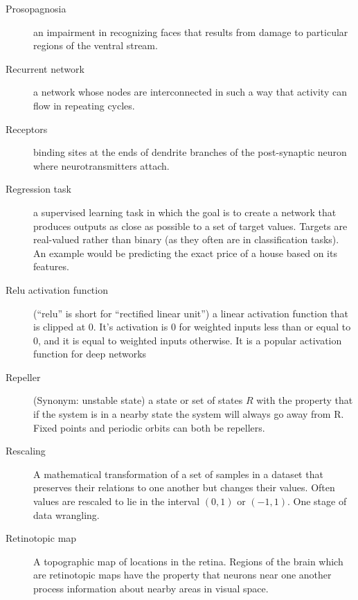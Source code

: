 \begin{description}
\item[Prosopagnosia] an impairment in recognizing faces that results from damage to particular regions of the ventral stream.


\item[Recurrent network] a network whose nodes are interconnected in such a way that activity can flow in repeating cycles.

\item[Receptors] binding sites at the ends of dendrite branches of the post-synaptic neuron where neurotransmitters attach.


\item[Regression task] a supervised learning task in which the goal is to create a network that produces outputs as close as possible to a set of target values. Targets are real-valued rather than binary (as they often are in classification tasks). An example would be predicting the exact price of a house based on its features.

\item[Relu activation function] (``relu'' is short for ``rectified linear unit'') a linear activation function that is clipped at  0. It's activation is 0 for weighted inputs less than or equal to 0, and it is equal to weighted inputs otherwise. It is a popular activation function for deep networks

\item[Repeller] (Synonym: unstable state) a state or set of states $R$ with the property that if the system is in a nearby state the system will always go away from R. Fixed points and periodic orbits can both be repellers.

\item[Rescaling] A mathematical transformation of a set of samples in a dataset that preserves their relations to one another but changes their values. Often values are rescaled to lie in the interval $(0,1)$ or $(-1,1)$. One stage of data wrangling.


\item[Retinotopic map] A topographic map of locations in the retina. Regions of the brain which are retinotopic maps have the property that neurons near one another process information about nearby areas in visual space.


\end{description}
